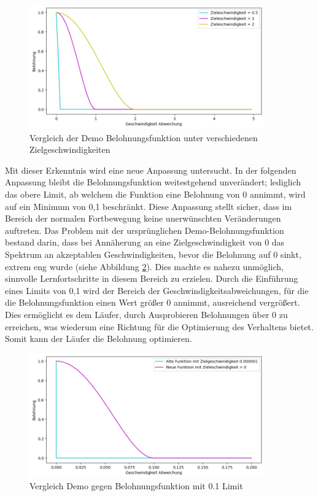 \begin{figure}[H]
  \centering  
  \includegraphics[width=0.9\textwidth]{img/match_velocity_demo_vergleich}
  \caption{Vergleich der Demo Belohnungsfunktion unter verschiedenen Zielgeschwindigkeiten}
  \label{fig:match_velocity_demo_vergleich}
\end{figure}

Mit dieser Erkenntnis wird eine neue Anpassung untersucht. In der folgenden Anpassung bleibt die Belohnungsfunktion weitestgehend unverändert; lediglich das obere Limit, ab welchem die Funktion eine Belohnung von 0 annimmt, wird auf ein Minimum von 0,1 beschränkt. Diese Anpassung stellt sicher, dass im Bereich der normalen Fortbewegung keine unerwünschten Veränderungen auftreten. Das Problem mit der ursprünglichen Demo-Belohnungsfunktion bestand darin, dass bei Annäherung an eine Zielgeschwindigkeit von 0 das Spektrum an akzeptablen Geschwindigkeiten, bevor die Belohnung auf 0 sinkt, extrem eng wurde (siehe Abbildung \ref{fig:match_velocity_vergleich_clip}). Dies machte es nahezu unmöglich, sinnvolle Lernfortschritte in diesem Bereich zu erzielen. Durch die Einführung eines Limits von 0,1 wird der Bereich der Geschwindigkeitsabweichungen, für die die Belohnungsfunktion einen Wert größer 0 annimmt, ausreichend vergrößert. Dies ermöglicht es dem Läufer, durch Ausprobieren Belohnungen über 0 zu erreichen, was wiederum eine Richtung für die Optimierung des Verhaltens bietet. Somit kann der Läufer die Belohnung optimieren.

\begin{figure}[H]
  \centering  
  \includegraphics[width=0.9\textwidth]{img/match_velocity_vergleich_clip}
  \caption{Vergleich Demo gegen Belohnungsfunktion mit 0.1 Limit}
  \label{fig:match_velocity_vergleich_clip}
\end{figure}


